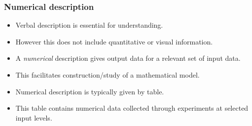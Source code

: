 \begin{frame}
\frametitle{Numerical description}
\begin{itemize}
\item Verbal description is essential for understanding.
\item<2-> However this does not include quantitative or visual information.
\item<3-> A \emph{numerical} description gives output data for a relevant set of input data.
\item<4-> This facilitates construction/study of a mathematical model.
\item<5-> Numerical description is typically given by table.
\item<6-> This table contains numerical data collected through experiments at selected input levels. 
\end{itemize}
\end{frame}

